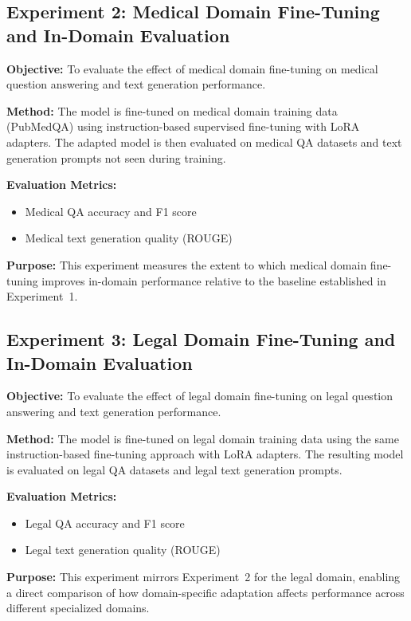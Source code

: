 \documentclass[12pt, letterpaper]{article}
\begin{document}

\subsection{Experiment 2: Medical Domain Fine-Tuning and In-Domain Evaluation}

\textbf{Objective:} To evaluate the effect of medical domain fine-tuning on medical question answering and text generation performance.

\textbf{Method:} The model is fine-tuned on medical domain training data (PubMedQA) using instruction-based supervised fine-tuning with LoRA adapters. The adapted model is then evaluated on medical QA datasets and text generation prompts not seen during training.

\textbf{Evaluation Metrics:}
\begin{itemize}
    \item Medical QA accuracy and F1 score
    \item Medical text generation quality (ROUGE)
\end{itemize}

\textbf{Purpose:} This experiment measures the extent to which medical domain fine-tuning improves in-domain performance relative to the baseline established in Experiment~1.


\subsection{Experiment 3: Legal Domain Fine-Tuning and In-Domain Evaluation}

\textbf{Objective:} To evaluate the effect of legal domain fine-tuning on legal question answering and text generation performance.

\textbf{Method:} The model is fine-tuned on legal domain training data using the same instruction-based fine-tuning approach with LoRA adapters. The resulting model is evaluated on legal QA datasets and legal text generation prompts.

\textbf{Evaluation Metrics:}
\begin{itemize}
    \item Legal QA accuracy and F1 score
    \item Legal text generation quality (ROUGE)
\end{itemize}

\textbf{Purpose:} This experiment mirrors Experiment~2 for the legal domain, enabling a direct comparison of how domain-specific adaptation affects performance across different specialized domains.
\end{document}
